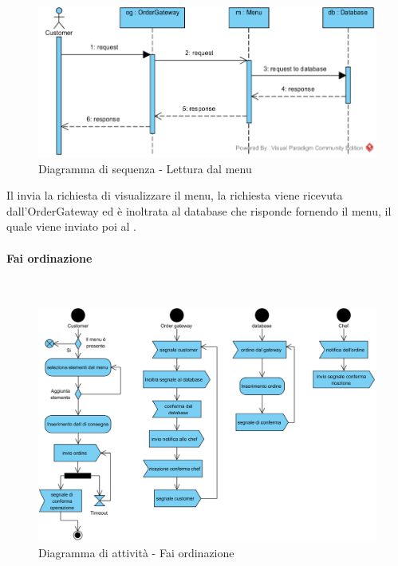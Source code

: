 \begin{figure}[H]
	\centering
	\includegraphics[width=14cm]{../../documenti/SpecificaTecnica/diagrammi_img/sequenza/client_visualizza_menu.png}
	\caption{Diagramma di sequenza - Lettura dal menu}
\end{figure}
Il \Customer{} invia la richiesta di visualizzare il menu, la richiesta viene ricevuta dall'Order\-Gateway ed è inoltrata al database che risponde fornendo il menu, il quale viene inviato poi al \Customer{}.


\paragraph{Fai ordinazione}\mbox{}\\
\nopagebreak
\begin{figure}[H]
	\centering
	\includegraphics[width=14cm]{diagrammi_img/attivita/customer_ordinazione.png}
	\caption{Diagramma di attività - Fai ordinazione}
\end{figure}

